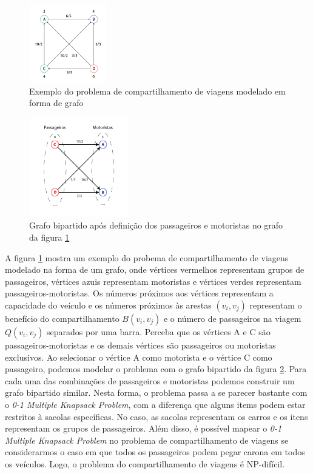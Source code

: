 \documentclass{article}
\begin{document}
\begin{figure}
  \center
  \includegraphics[width=128px]{graph.png}
  \caption{Exemplo do problema de compartilhamento de viagens modelado em forma de grafo}
  \label{fig:graph}
\end{figure}

\begin{figure}
  \center
  \includegraphics[width=164px]{bipartite_graph.png}
  \caption{Grafo bipartido após definição dos passageiros e motoristas no grafo da figura \ref{fig:graph}}
  \label{fig:bipartite_graph}
\end{figure}

A figura \ref{fig:graph} mostra um exemplo do probema de compartilhamento de viagens modelado na forma de um grafo, onde vértices
vermelhos representam grupos de passageiros, vértices azuis representam motoristas e vértices verdes representam passageiros-motoristas. Os números
próximos aos vértices representam a capacidade do veículo e os números próximos às arestas $ (v_i, v_j) $ representam o 
benefício do compartilhamento $ B(v_i, v_j) $ e o número de passageiros na viagem $ Q(v_i, v_j) $ separados por uma barra.
Perceba que os vértices A e C são passageiros-motoristas e os demais vértices são passageiros ou motoristas exclusivos. Ao selecionar 
o vértice A como motorista e o vértice C como passageiro, podemos modelar o problema com o grafo bipartido da figura \ref{fig:bipartite_graph}.
Para cada uma das combinações de passageiros e motoristas podemos construir um grafo bipartido similar. Nesta forma, o problema passa a se parecer
bastante com o \textit{0-1 Multiple Knapsack Problem}, com a diferença que alguns items podem estar restritos à sacolas específicas. 
No caso, as sacolas representam os carros e os itens representam os grupos de passageiros.
Além disso, é possível mapear o \textit{0-1 Multiple Knapsack Problem} no problema de compartilhamento de viagens se considerarmos 
o caso em que todos os passageiros podem pegar carona em todos os veículos. Logo, o problema do compartilhamento de viagens é NP-difícil.
\end{document}

